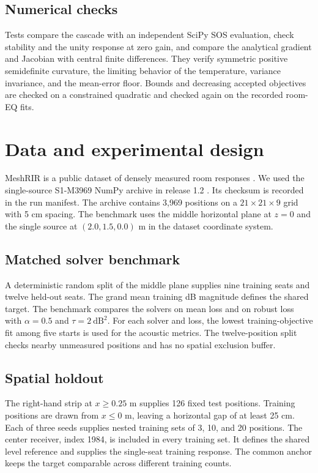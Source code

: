 \documentclass[11pt,letterpaper]{article}
\newcommand{\loss}{\mathrm{dB}^2}
\begin{document}
\subsection{Numerical checks}
Tests compare the cascade with an independent SciPy SOS evaluation, check
stability and the unity response at zero gain, and compare the analytical
gradient and Jacobian with central finite differences. They verify symmetric
positive semidefinite curvature, the limiting behavior of the temperature,
variance invariance, and the mean-error floor. Bounds and decreasing
accepted objectives are checked on a constrained quadratic and checked
again on the recorded room-EQ fits.

\clearpage
\section{Data and experimental design}
MeshRIR is a public dataset of densely measured room responses \cite{mesh}.
We used the single-source S1-M3969 NumPy archive in release 1.2
\cite{release}. Its checksum is recorded in the run manifest. The archive
contains 3,969 positions on a $21\times21\times9$ grid with 5 cm spacing.
The benchmark uses the middle horizontal plane at $z=0$ and the single
source at $(2.0,1.5,0.0)$ m in the dataset coordinate system.

\subsection{Matched solver benchmark}
A deterministic random split of the middle plane supplies nine training
seats and twelve held-out seats. The grand mean training dB magnitude
defines the shared target. The benchmark compares the solvers on mean
loss and on robust loss with $\alpha=0.5$ and $\tau=2~\loss$.
For each solver and loss, the lowest training-objective fit among five
starts is used for the acoustic metrics. The twelve-position split checks
nearby unmeasured positions and has no spatial exclusion buffer.

\subsection{Spatial holdout}
The right-hand strip at $x\geq0.25$ m supplies 126 fixed test positions.
Training positions are drawn from $x\leq0$ m, leaving a horizontal gap of
at least 25 cm. Each of three seeds supplies nested training sets of 3,
10, and 20 positions. The center receiver, index 1984, is included in
every training set. It defines the shared level reference and supplies the
single-seat training response. The common anchor keeps the target
comparable across different training counts.
\end{document}
